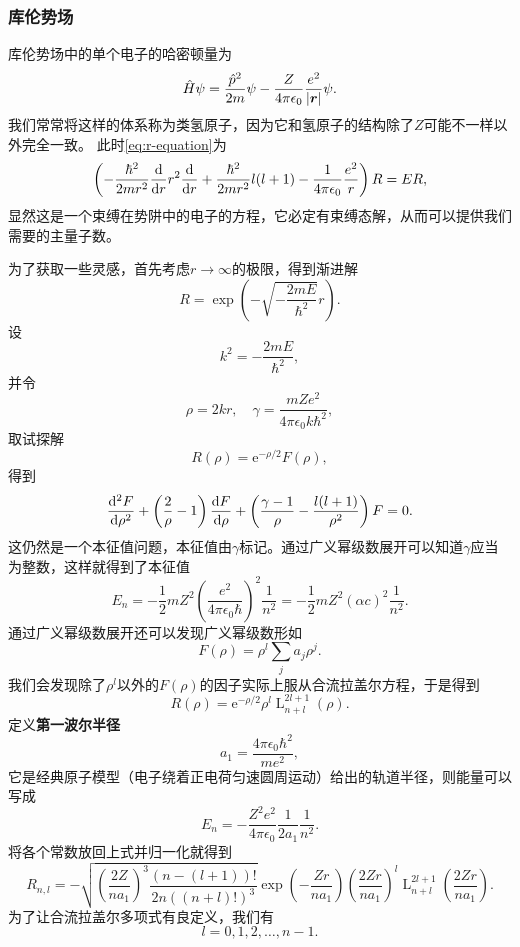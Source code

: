 \documentclass[UTF8, a4paper]{ctexart}
\newcommand*{\ee}{\mathrm{e}}
\DeclareMathOperator{\laguerre}{L}
\begin{document}
\subsubsection{库伦势场}

库伦势场中的单个电子的哈密顿量为
\begin{equation}
    \hat{H} \psi = \frac{\hat{p}^2}{2m} \psi - \frac{Z}{4\pi \epsilon_0} \frac{e^2}{\abs{\vb*{r}}} \psi.
    \label{eq:columb-electron-hamiltonian}
\end{equation}
我们常常将这样的体系称为类氢原子，因为它和氢原子的结构除了$Z$可能不一样以外完全一致。
此时\eqref{eq:r-equation}为
\[
    \left( - \frac{\hbar^2}{2m r^2} \dv{r} r^2 \dv{r} + \frac{\hbar^2}{2m r^2} l(l+1) - \frac{1}{4\pi \epsilon_0} \frac{e^2}{r} \right) R = E R,
\]
显然这是一个束缚在势阱中的电子的方程，它必定有束缚态解，从而可以提供我们需要的主量子数。

为了获取一些灵感，首先考虑$r\to \infty$的极限，得到渐进解
\[
    R = \exp(- \sqrt{- \frac{2 m E}{\hbar^2}} r).
\]
设
\[
    k^2 = - \frac{2 m E}{\hbar^2},
\]
并令
\[
    \rho = 2 k r, \quad \gamma = \frac{m Z e^2}{4\pi \epsilon_0 k \hbar^2}, 
\]
取试探解
\[
    R(\rho) = \ee^{- \rho / 2} F(\rho),
\]
得到
\[
    \dv[2]{F}{\rho} + \left( \frac{2}{\rho} - 1 \right) \dv{F}{\rho} + \left( \frac{\gamma - 1}{\rho} - \frac{l(l+1)}{\rho^2} \right) F = 0.
\]
这仍然是一个本征值问题，本征值由$\gamma$标记。通过广义幂级数展开可以知道$\gamma$应当为整数，这样就得到了本征值
\begin{equation}
    E_n = - \frac{1}{2} m Z^2 \left( \frac{e^2}{4\pi \epsilon_0 \hbar} \right)^2 \frac{1}{n^2} = - \frac{1}{2} m Z^2 (\alpha c)^2 \frac{1}{n^2}.
\end{equation}
通过广义幂级数展开还可以发现广义幂级数形如
\[
    F(\rho) = \rho^l \sum_j a_j \rho^j.
\]
我们会发现除了$\rho^l$以外的$F(\rho)$的因子实际上服从合流拉盖尔方程，于是得到
\[
    R(\rho) = \ee^{-\rho/2} \rho^l \laguerre_{n+l}^{2l+1}(\rho).
\]
定义\textbf{第一波尔半径}
\begin{equation}
    a_1 = \frac{4\pi \epsilon_0 \hbar^2}{m e^2},
\end{equation}
它是经典原子模型（电子绕着正电荷匀速圆周运动）给出的轨道半径，则能量可以写成
\begin{equation}
    E_n = - \frac{Z^2 e^2}{4 \pi \epsilon_0 } \frac{1}{2 a_1} \frac{1}{n^2}.
\end{equation}
将各个常数放回上式并归一化就得到
\begin{equation}
    R_{n, l} = - \sqrt{\left( \frac{2 Z}{n a_1} \right)^3 \frac{(n-(l+1))!}{2n ((n + l)!)^3}} \exp(- \frac{Z r}{n a_1}) \left( \frac{2 Z r}{n a_1} \right)^l \laguerre_{n+l}^{2l+1}\left(\frac{2 Z r}{n a_1}\right).
\end{equation}
为了让合流拉盖尔多项式有良定义，我们有
\begin{equation}
    l = 0, 1, 2, \ldots, n-1.
\end{equation}
\end{document}

